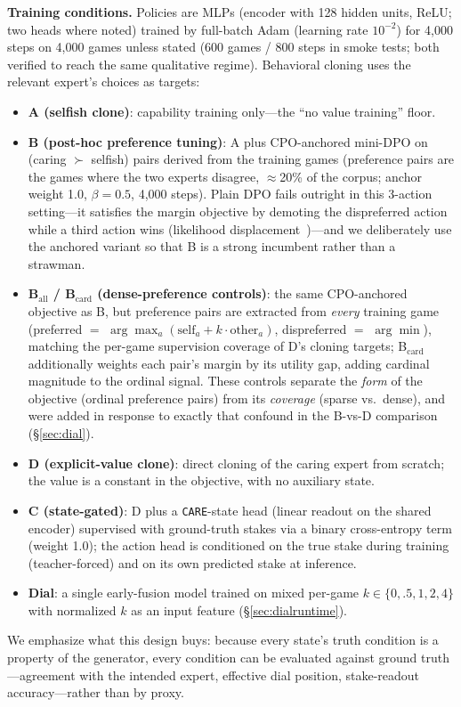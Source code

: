 \documentclass[11pt]{article}
\newcommand{\care}{\texttt{CARE}}
\begin{document}
\textbf{Training conditions.} Policies are MLPs (encoder with 128 hidden units, ReLU; two heads
where noted) trained by full-batch Adam (learning rate $10^{-2}$) for 4{,}000 steps on 4{,}000
games unless stated (600 games / 800 steps in smoke tests; both verified to reach the same
qualitative regime). Behavioral cloning uses the relevant expert's choices as targets:
\begin{itemize}
\item \textbf{A (selfish clone)}: capability training only---the ``no value training'' floor.
\item \textbf{B (post-hoc preference tuning)}: A plus CPO-anchored mini-DPO on
  (caring $\succ$ selfish) pairs derived from the training games (preference pairs are the games
  where the two experts disagree, $\approx$20\% of the corpus; anchor weight 1.0,
  $\beta{=}0.5$, 4{,}000 steps). Plain DPO fails outright in this 3-action setting---it
  satisfies the margin objective by demoting the dispreferred action while a third action wins
  (likelihood displacement~\cite{razin2024unintentional})---and we deliberately use the anchored
  variant so that B is a strong incumbent rather than a strawman.
\item \textbf{B$_{\mathrm{all}}$ / B$_{\mathrm{card}}$ (dense-preference controls)}: the same
  CPO-anchored objective as B, but preference pairs are extracted from \emph{every} training
  game (preferred $=$ $\arg\max_a(\mathrm{self}_a + k\cdot\mathrm{other}_a)$, dispreferred $=$
  $\arg\min$), matching the per-game supervision coverage of D's cloning targets;
  B$_{\mathrm{card}}$ additionally weights each pair's margin by its utility gap, adding cardinal
  magnitude to the ordinal signal. These controls separate the \emph{form} of the objective
  (ordinal preference pairs) from its \emph{coverage} (sparse vs.\ dense), and were added in
  response to exactly that confound in the B-vs-D comparison (\S\ref{sec:dial}).
\item \textbf{D (explicit-value clone)}: direct cloning of the caring expert from scratch; the
  value is a constant in the objective, with no auxiliary state.
\item \textbf{C (state-gated)}: D plus a \care{}-state head (linear readout on the shared
  encoder) supervised with ground-truth stakes via a binary cross-entropy term (weight 1.0);
  the action head is conditioned on the true stake during training (teacher-forced) and on its
  own predicted stake at inference.
\item \textbf{Dial}: a single early-fusion model trained on mixed per-game
  $k \in \{0, .5, 1, 2, 4\}$ with normalized $k$ as an input feature (\S\ref{sec:dialruntime}).
\end{itemize}
We emphasize what this design buys: because every state's truth condition is a property of the
generator, every condition can be evaluated against ground truth---agreement with the intended
expert, effective dial position, stake-readout accuracy---rather than by proxy.
\end{document}
